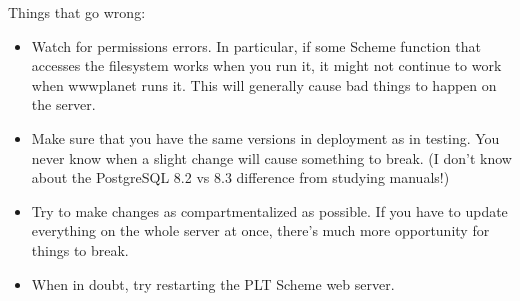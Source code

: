 \documentclass{article}
\begin{document}
Things that go wrong:

\begin{itemize}
\item Watch for permissions errors. In particular, if some Scheme function
  that accesses the filesystem works when you run it, it might not
  continue to work when wwwplanet runs it. This will generally cause
  bad things to happen on the server.

\item Make sure that you have the same versions in deployment as in
  testing. You never know when a slight change will cause something to
  break. (I don't know about the PostgreSQL 8.2 vs 8.3 difference from
  studying manuals!)

\item Try to make changes as compartmentalized as possible. If you have to
  update everything on the whole server at once, there's much more
  opportunity for things to break.

\item When in doubt, try restarting the PLT Scheme web server.
\end{itemize}
\end{document}
